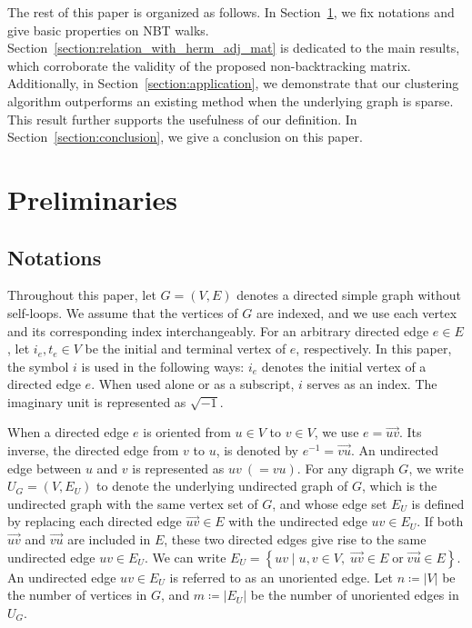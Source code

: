 \documentclass{article}
\theoremstyle{plain}
\begin{document}
The rest of this paper is organized as follows.
In Section~\ref{section:preliminaries}, we fix notations and give basic properties on NBT walks.
Section~\ref{section:relation_with_herm_adj_mat} is dedicated to the main results, which corroborate the validity of the proposed non-backtracking matrix.
Additionally, in Section~\ref{section:application}, we demonstrate that our clustering algorithm outperforms an existing method when the underlying graph is sparse.
This result further supports the usefulness of our definition.
In Section~\ref{section:conclusion}, we give a conclusion on this paper.

\section{Preliminaries}\label{section:preliminaries}

\subsection{Notations}

Throughout this paper, let $G=(V,E)$ denotes a directed simple graph without self-loops.
We assume that the vertices of $G$ are indexed, and we use each vertex and its corresponding index interchangeably.
For an arbitrary directed edge $e \in E$, let $i_{e}, t_{e} \in V$ be the initial and terminal vertex of $e$, respectively.
In this paper, the symbol $i$ is used in the following ways: $i_{e}$ denotes the initial vertex of a directed edge $e$.
When used alone or as a subscript, $i$ serves as an index. The imaginary unit is represented as $\sqrt{-1}$.

When a directed edge $e$ is oriented from $u\in V$ to $v \in V$, we use $e=\overrightarrow{uv}$.
Its inverse, the directed edge from $v$ to $u$, is denoted by $e^{-1} = \overrightarrow{vu}$.
An undirected edge between $u$ and $v$ is represented as $uv~(=vu)$.
For any digraph $G$, we write $U_G = (V, E_U)$ to denote the underlying undirected graph of $G$, which is the undirected graph with the same vertex set of $G$, and whose edge set $E_U$ is defined by replacing each directed edge $\overrightarrow{uv} \in E$ with the undirected edge $uv \in E_U$. If both $\overrightarrow{uv}$ and $\overrightarrow{vu}$ are included in $E$, these two directed edges give rise to the same undirected edge $uv \in E_U$.
We can write $E_U = \left\{ uv \mid u,v \in V,\; \overrightarrow{uv} \in E \;\text{or}\; \overrightarrow{vu} \in E \right\}$.
An undirected edge $uv \in E_U$ is referred to as an unoriented edge.
Let $n\coloneqq \left| V \right|$ be the number of vertices in $G$, and $m\coloneqq \left| E_U \right|$ be the number of unoriented edges in $U_G$.
\end{document}
